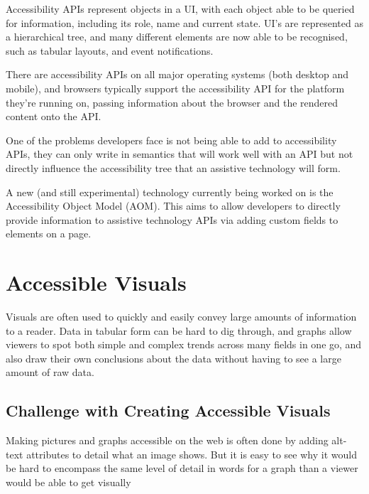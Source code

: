 \documentclass[ %
                    author={Aleena Baig},
                supervisor={Dr Simon Lock},
                    degree={BSc},
                     title={On Making Web Accessible Graphs},
                  subtitle={},
                      year={2019} ]{dissertation}
\begin{document}
Accessibility APIs represent objects in a UI, with each object able to be queried for information, including its role, name and current state. UI's are represented as a hierarchical tree, and many different elements are now able to be recognised, such as tabular layouts, and event notifications.

There are accessibility APIs on all major operating systems (both desktop and mobile), and browsers typically support the accessibility API for the platform they're running on, passing information about the browser and the rendered content onto the API.

One of the problems developers face is not being able to add to accessibility APIs, they can only write in semantics that will work well with an API but not directly influence the accessibility tree that an assistive technology will form.

A new (and still experimental) technology currently being worked on is the Accessibility Object Model (AOM). This aims to allow developers to directly provide information to assistive technology APIs via adding custom fields to elements on a page.


\section{Accessible Visuals}

Visuals are often used to quickly and easily convey large amounts of information to a reader. Data in tabular form can be hard to dig through, and graphs allow viewers to spot both simple and complex trends across many fields in one go, and also draw their own conclusions about the data without having to see a large amount of raw data.


\subsection{Challenge with Creating Accessible Visuals}

Making pictures and graphs accessible on the web is often done by adding alt-text attributes to detail what an image shows. But it is easy to see why it would be hard to encompass the same level of detail in words for a graph than a viewer would be able to get visually
\end{document}
